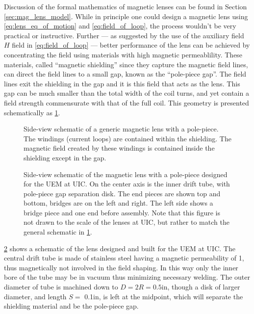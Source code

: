 Discussion of the formal mathematics of magnetic lenses can be found in Section \ref{sec:mag_lens_model}.
While in principle one could design a magnetic lens using \ref{eq:lens_eq_of_motion} and \ref{eq:field_of_loop}, the process wouldn't be very practical or instructive.
Further --- as suggested by the use of the auxiliary field $H$ field in \ref{eq:field_of_loop} --- better performance of the lens can be achieved by concentrating the field using materials with high magnetic permeablility.
These materials, called ``magnetic shielding'' since they capture the magnetic field lines, can direct the field lines to a small gap, known as the ``pole-piece gap''.
The field lines exit the shielding in the gap and it is this field that acts as the lens.
This gap can be much smaller than the total width of the coil turns, and yet contain a field strength commensurate with that of the full coil.
This geometry is presented schematically as \ref{fig:polepiece-schematic}.

\begin{figure}
  \centering
  
  \caption[Schematic of a generic magnetic lens with a pole-piece]{
    Side-view schematic of a generic magnetic lens with a pole-piece.
    The windings (current loops) are contained within the shielding.
    The magnetic field created by these windings is contained inside the shielding except in the gap.
  }
  \label{fig:polepiece-schematic}
\end{figure}

\begin{figure}
  \centering
  
  \caption[Design schematic of our magnetic lens with a pole-piece]{
    Side-view schematic of the magnetic lens with a pole-piece designed for the UEM at UIC.
    On the center axis is the inner drift tube, with pole-piece gap separation disk.
    The end pieces are shown top and bottom, bridges are on the left and right.
    The left side shows a bridge piece and one end before assembly.
    Note that this figure is not drawn to the scale of the lenses at UIC, but rather to match the general schematic in \ref{fig:polepiece-schematic}.
  }
  \label{fig:polepiece-design}
\end{figure}

\ref{fig:polepiece-design} shows a schematic of the lens designed and built for the UEM at UIC.
The central drift tube is made of stainless steel having a magnetic permeability of 1, thus magnetically not involved in the field shaping.
In this way only the inner bore of the tube may be in vacuum thus minimizing necessary welding.
The outer diameter of tube is machined down to $ D = 2R = 0.5 \text{in}$, though a disk of larger diameter, and length $ S = $ 0.1in, is left at the midpoint, which will separate the shielding material and be the pole-piece gap.

